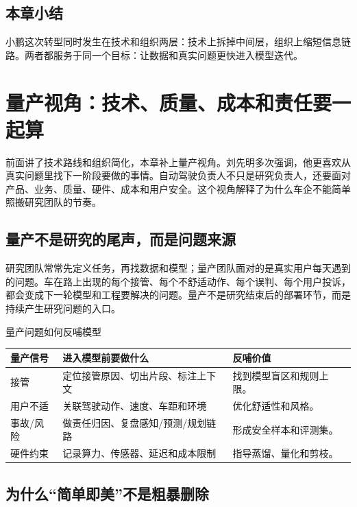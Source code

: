 \documentclass[a4paper]{article}
\begin{document}
\subsection{本章小结}

小鹏这次转型同时发生在技术和组织两层：技术上拆掉中间层，组织上缩短信息链路。两者都服务于同一个目标：让数据和真实问题更快进入模型迭代。

\section{量产视角：技术、质量、成本和责任要一起算}

前面讲了技术路线和组织简化，本章补上量产视角。刘先明多次强调，他更喜欢从真实问题里找下一阶段要做的事情。自动驾驶负责人不只是研究负责人，还要面对产品、业务、质量、硬件、成本和用户安全。这个视角解释了为什么车企不能简单照搬研究团队的节奏。

\subsection{量产不是研究的尾声，而是问题来源}

研究团队常常先定义任务，再找数据和模型；量产团队面对的是真实用户每天遇到的问题。车在路上出现的每个接管、每个不舒适动作、每个误判、每个用户投诉，都会变成下一轮模型和工程要解决的问题。量产不是研究结束后的部署环节，而是持续产生研究问题的入口。

\begin{knowledgebox}{量产问题如何反哺模型}
\begin{tabularx}{\textwidth}{p{}p{}X}
\toprule
量产信号 & 进入模型前要做什么 & 反哺价值 \\
\midrule
接管 & 定位接管原因、切出片段、标注上下文 & 找到模型盲区和规则上限。 \\
用户不适 & 关联驾驶动作、速度、车距和环境 & 优化舒适性和风格。 \\
事故/风险 & 做责任归因、复盘感知/预测/规划链路 & 形成安全样本和评测集。 \\
硬件约束 & 记录算力、传感器、延迟和成本限制 & 指导蒸馏、量化和剪枝。 \\
\bottomrule
\end{tabularx}
\end{knowledgebox}

\subsection{为什么“简单即美”不是粗暴删除}
\end{document}
